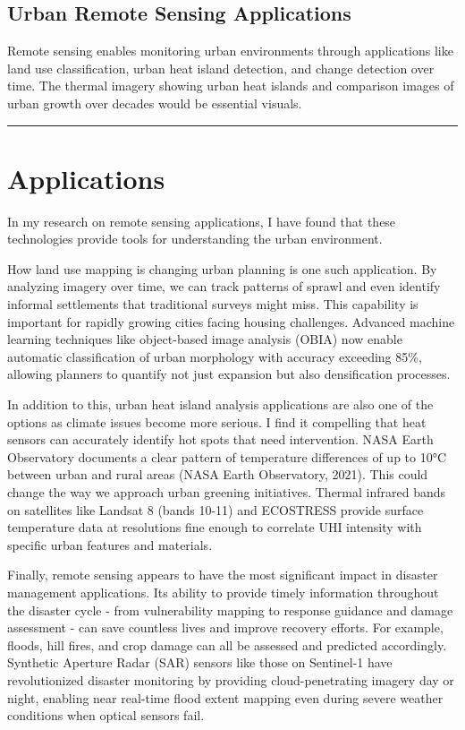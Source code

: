 \documentclass[
  letterpaper,
  DIV=11,
  numbers=noendperiod]{scrreprt}
\begin{document}
\subsection{Urban Remote Sensing
Applications}\label{urban-remote-sensing-applications}

Remote sensing enables monitoring urban environments through
applications like land use classification, urban heat island detection,
and change detection over time. The thermal imagery showing urban heat
islands and comparison images of urban growth over decades would be
essential visuals.

\begin{center}\rule{0.5\linewidth}{0.5pt}\end{center}

\section{Applications}\label{applications}

In my research on remote sensing applications, I have found that these
technologies provide tools for understanding the urban environment.

How land use mapping is changing urban planning is one such application.
By analyzing imagery over time, we can track patterns of sprawl and even
identify informal settlements that traditional surveys might miss. This
capability is important for rapidly growing cities facing housing
challenges. Advanced machine learning techniques like object-based image
analysis (OBIA) now enable automatic classification of urban morphology
with accuracy exceeding 85\%, allowing planners to quantify not just
expansion but also densification processes.

In addition to this, urban heat island analysis applications are also
one of the options as climate issues become more serious. I find it
compelling that heat sensors can accurately identify hot spots that need
intervention. NASA Earth Observatory documents a clear pattern of
temperature differences of up to 10°C between urban and rural areas
(NASA Earth Observatory, 2021). This could change the way we approach
urban greening initiatives. Thermal infrared bands on satellites like
Landsat 8 (bands 10-11) and ECOSTRESS provide surface temperature data
at resolutions fine enough to correlate UHI intensity with specific
urban features and materials.

Finally, remote sensing appears to have the most significant impact in
disaster management applications. Its ability to provide timely
information throughout the disaster cycle - from vulnerability mapping
to response guidance and damage assessment - can save countless lives
and improve recovery efforts. For example, floods, hill fires, and crop
damage can all be assessed and predicted accordingly. Synthetic Aperture
Radar (SAR) sensors like those on Sentinel-1 have revolutionized
disaster monitoring by providing cloud-penetrating imagery day or night,
enabling near real-time flood extent mapping even during severe weather
conditions when optical sensors fail.
\end{document}
